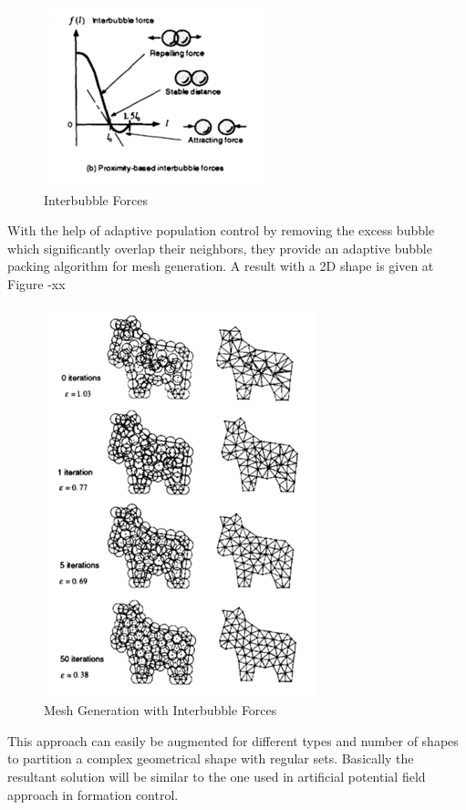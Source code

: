 \documentclass[twoside]{article}
\begin{document}
\begin{figure}[H]
	\caption{Interbubble Forces}
	\centering
	\includegraphics[scale = 1]{interbubble}
\end{figure}


With the help of adaptive population control by removing the excess bubble which significantly overlap their neighbors, they provide an adaptive bubble packing algorithm for mesh generation. A result with a 2D shape is given at Figure -xx


\begin{figure}[H]
	\caption{Mesh Generation with Interbubble Forces}
	\centering
	\includegraphics[scale = 1]{interbubble2}
\end{figure}

This approach can easily be augmented for different types and number of shapes to partition a complex geometrical shape with regular sets. Basically the resultant solution will be similar to the one used in artificial potential field approach in formation control. 
\end{document}
